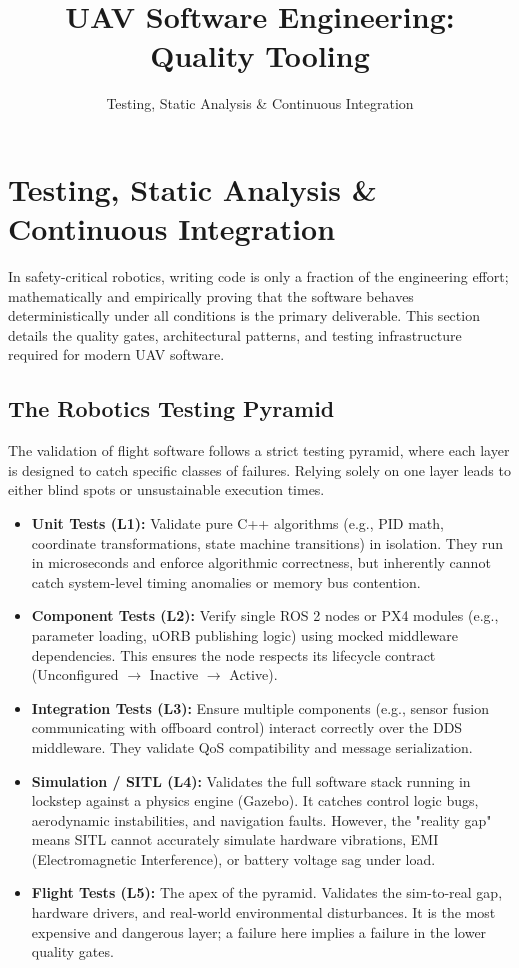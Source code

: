 \documentclass{article}
\title{UAV Software Engineering: Quality Tooling}
\author{Testing, Static Analysis \& Continuous Integration}
\date{}
\begin{document}
\maketitle

\section{Testing, Static Analysis \& Continuous Integration}
In safety-critical robotics, writing code is only a fraction of the engineering effort; mathematically and empirically proving that the software behaves deterministically under all conditions is the primary deliverable. This section details the quality gates, architectural patterns, and testing infrastructure required for modern UAV software.

\subsection{The Robotics Testing Pyramid}
The validation of flight software follows a strict testing pyramid, where each layer is designed to catch specific classes of failures. Relying solely on one layer leads to either blind spots or unsustainable execution times.
\begin{itemize}
    \item \textbf{Unit Tests (L1):} Validate pure C++ algorithms (e.g., PID math, coordinate transformations, state machine transitions) in isolation. They run in microseconds and enforce algorithmic correctness, but inherently cannot catch system-level timing anomalies or memory bus contention.
    \item \textbf{Component Tests (L2):} Verify single ROS 2 nodes or PX4 modules (e.g., parameter loading, uORB publishing logic) using mocked middleware dependencies. This ensures the node respects its lifecycle contract (Unconfigured $\rightarrow$ Inactive $\rightarrow$ Active).
    \item \textbf{Integration Tests (L3):} Ensure multiple components (e.g., sensor fusion communicating with offboard control) interact correctly over the DDS middleware. They validate QoS compatibility and message serialization.
    \item \textbf{Simulation / SITL (L4):} Validates the full software stack running in lockstep against a physics engine (Gazebo). It catches control logic bugs, aerodynamic instabilities, and navigation faults. However, the "reality gap" means SITL cannot accurately simulate hardware vibrations, EMI (Electromagnetic Interference), or battery voltage sag under load.
    \item \textbf{Flight Tests (L5):} The apex of the pyramid. Validates the sim-to-real gap, hardware drivers, and real-world environmental disturbances. It is the most expensive and dangerous layer; a failure here implies a failure in the lower quality gates.
\end{itemize}
\end{document}
